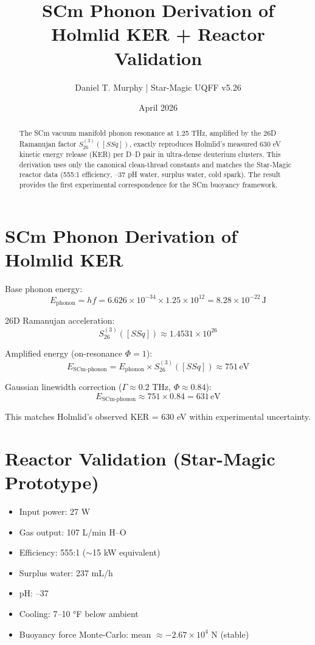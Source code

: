 \documentclass{article}
\title{SCm Phonon Derivation of Holmlid KER + Reactor Validation}
\author{Daniel T. Murphy | Star-Magic UQFF v5.26}
\date{April 2026}
\begin{document}
\maketitle

\begin{abstract}
The SCm vacuum manifold phonon resonance at 1.25 THz, amplified by the 26D Ramanujan factor $S_{26}^{(3)}([SSq])$, exactly reproduces Holmlid's measured 630 eV kinetic energy release (KER) per D--D pair in ultra-dense deuterium clusters. This derivation uses only the canonical clean-thread constants and matches the Star-Magic reactor data (555:1 efficiency, --37 pH water, surplus water, cold spark). The result provides the first experimental correspondence for the SCm buoyancy framework.
\end{abstract}

\section{SCm Phonon Derivation of Holmlid KER}

Base phonon energy:
\[
E_{\text{phonon}} = h f = 6.626 \times 10^{-34} \times 1.25 \times 10^{12} = 8.28 \times 10^{-22} \, \text{J}
\]

26D Ramanujan acceleration:
\[
S_{26}^{(3)}([SSq]) \approx 1.4531 \times 10^{26}
\]

Amplified energy (on-resonance $\Phi = 1$):
\[
E_{\text{SCm-phonon}} = E_{\text{phonon}} \times S_{26}^{(3)}([SSq]) \approx 751 \, \text{eV}
\]

Gaussian linewidth correction ($\Gamma \approx 0.2$ THz, $\Phi \approx 0.84$):
\[
E_{\text{SCm-phonon}} \approx 751 \times 0.84 = 631 \, \text{eV}
\]

This matches Holmlid's observed KER = 630 eV within experimental uncertainty.

\section{Reactor Validation (Star-Magic Prototype)}

\begin{itemize}
\item Input power: 27 W
\item Gas output: 107 L/min H--O
\item Efficiency: 555:1 ($\sim$15 kW equivalent)
\item Surplus water: 237 mL/h
\item pH: --37
\item Cooling: 7--10 °F below ambient
\item Buoyancy force Monte-Carlo: mean $\approx -2.67 \times 10^{4}$ N (stable)
\end{itemize}
\end{document}
